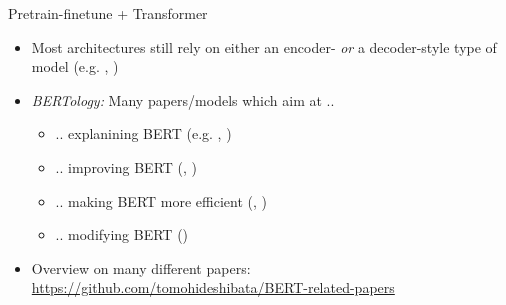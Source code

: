 \begin{frame}{Pretrain-finetune + Transformer}

\vfill

\begin{itemize}
\item Most architectures still rely on either an encoder- \textit{or} a decoder-style type of model (e.g. \href{https://cdn.openai.com/better-language-models/language_models_are_unsupervised_multitask_learners.pdf}{}, \href{https://arxiv.org/pdf/1906.08237.pdf}{})
\item \textit{BERTology:} Many papers/models which aim at ..
			\begin{itemize}
				\item .. explanining BERT (e.g. \href{https://arxiv.org/pdf/1906.02715.pdf}{}, \href{https://arxiv.org/pdf/1905.10650.pdf}{})
				\item .. improving BERT (\href{https://arxiv.org/pdf/1907.11692.pdf}{}, \href{https://arxiv.org/pdf/1909.11942.pdf}{})
				\item .. making BERT more efficient (\href{https://arxiv.org/pdf/1909.11942.pdf}{}, \href{https://arxiv.org/pdf/1910.01108.pdf}{})
				\item .. modifying BERT (\href{https://arxiv.org/pdf/1910.13461.pdf}{})
			\end{itemize}
\item Overview on many different papers:\\
			\href{https://github.com/tomohideshibata/BERT-related-papers}{https://github.com/tomohideshibata/BERT-related-papers}
\end{itemize}

\vfill

\end{frame}


